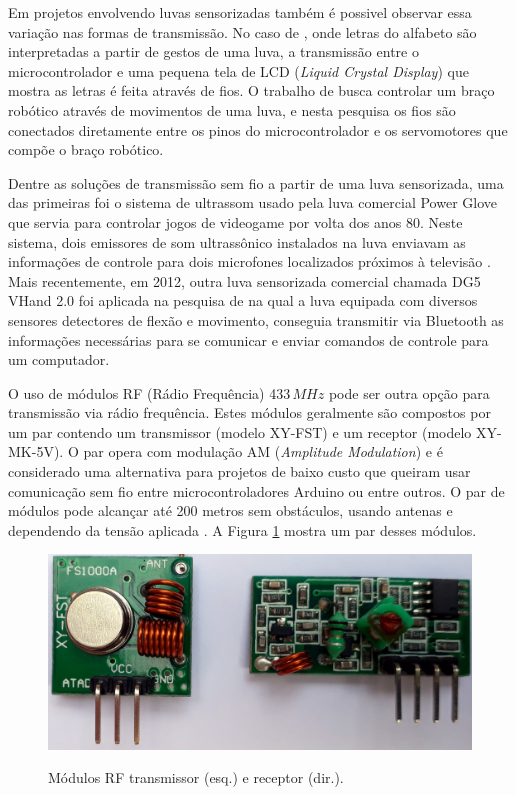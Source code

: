 \documentclass[
	12pt,				%
	openright,			%
	oneside,			%
	a4paper,			%
	english,			%
	brazil				%
	]{abntex2}
\begin{document}
		Em projetos envolvendo luvas sensorizadas também é possivel observar essa variação nas formas de transmissão. No caso de \cite{solanki2013sign}, onde letras do alfabeto são interpretadas a partir de gestos de uma luva, a transmissão entre o microcontrolador e uma pequena tela de LCD (\textit{Liquid Crystal Display})  que mostra as letras é feita através de fios. O trabalho de \cite{syed2012armcontroller} busca controlar um braço robótico através de movimentos de uma luva, e nesta pesquisa os fios são conectados diretamente entre os pinos do microcontrolador e os servomotores que compõe o braço robótico.

		Dentre as soluções de transmissão sem fio a partir de uma luva sensorizada, uma das primeiras foi o sistema de ultrassom usado pela luva comercial Power Glove que servia para controlar jogos de videogame por volta dos anos 80. Neste sistema, dois emissores de som ultrassônico instalados na luva enviavam as informações de controle para dois microfones localizados próximos à televisão \cite{dana1989powerglove}. Mais recentemente, em 2012, outra luva sensorizada comercial chamada DG5 VHand 2.0 foi aplicada na pesquisa de \cite{kumar2012hci} na qual a luva equipada com diversos sensores detectores de flexão e movimento, conseguia transmitir via Bluetooth as informações necessárias para se comunicar e enviar comandos de controle para um computador.

		O uso de módulos RF (Rádio Frequência) 433$\,MHz$ pode ser outra opção para transmissão via rádio frequência. Estes módulos geralmente são compostos por um par contendo um transmissor (modelo XY-FST) e um receptor (modelo XY-MK-5V). O par opera com modulação AM (\textit{Amplitude Modulation}) e é considerado uma alternativa para projetos de baixo custo que queiram usar comunicação sem fio entre microcontroladores Arduino ou entre outros. O par de módulos pode alcançar até 200 metros sem obstáculos, usando antenas e dependendo da tensão aplicada \cite{institutodigitalrf}. A Figura \ref{Fig:tx-rx1} mostra um par desses módulos.



		\begin{figure}[h!]
			\centering
			\caption{Módulos RF transmissor (esq.) e receptor (dir.).}
  		\includegraphics[width=12cm]{./figures/tx-rx1.jpg}
  		\label{Fig:tx-rx1}
		\end{figure}
\end{document}
